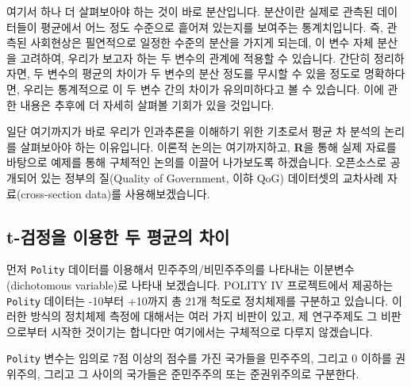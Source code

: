 \documentclass[]{book}
\newenvironment{Shaded}{\begin{snugshade}}{\end{snugshade}}
\newcommand{\CommentTok}[1]{\textcolor[rgb]{0.56,0.35,0.01}{\textit{#1}}}
\newcommand{\DataTypeTok}[1]{\textcolor[rgb]{0.13,0.29,0.53}{#1}}
\newcommand{\DecValTok}[1]{\textcolor[rgb]{0.00,0.00,0.81}{#1}}
\newcommand{\KeywordTok}[1]{\textcolor[rgb]{0.13,0.29,0.53}{\textbf{#1}}}
\newcommand{\NormalTok}[1]{#1}
\newcommand{\OperatorTok}[1]{\textcolor[rgb]{0.81,0.36,0.00}{\textbf{#1}}}
\newcommand{\StringTok}[1]{\textcolor[rgb]{0.31,0.60,0.02}{#1}}
\begin{document}
여기서 하나 더 살펴보아야 하는 것이 바로 분산입니다. 분산이란 실제로 관측된 데이터들이 평균에서 어느 정도 수준으로 흩어져 있는지를 보여주는 통계치입니다. 즉, 관측된 사회현상은 필연적으로 일정한 수준의 분산을 가지게 되는데, 이 변수 자체 분산을 고려하여, 우리가 보고자 하는 두 변수의 관계에 적용할 수 있습니다. 간단히 정리하자면, 두 변수의 평균의 차이가 두 변수의 분산 정도를 무시할 수 있을 정도로 명확하다면, 우리는 통계적으로 이 두 변수 간의 차이가 유의미하다고 볼 수 있습니다. 이에 관한 내용은 추후에 더 자세히 살펴볼 기회가 있을 것입니다.

일단 여기까지가 바로 우리가 인과추론을 이해하기 위한 기초로서 평균 차 분석의 논리를 살펴보아야 하는 이유입니다. 이론적 논의는 여기까지하고, \textbf{R}을 통해 실제 자료를 바탕으로 예제를 통해 구체적인 논의를 이끌어 나가보도록 하겠습니다. 오픈소스로 공개되어 있는 정부의 질(Quality of Government, 이햐 QoG) 데이터셋의 교차사례 자료(cross-section data)를 사용해보겠습니다.

\begin{Shaded}
\end{Shaded}

\hypertarget{t-uxac80uxc815uxc744-uxc774uxc6a9uxd55c-uxb450-uxd3c9uxade0uxc758-uxcc28uxc774}{%
\subsection{t-검정을 이용한 두 평균의 차이}\label{t-uxac80uxc815uxc744-uxc774uxc6a9uxd55c-uxb450-uxd3c9uxade0uxc758-uxcc28uxc774}}

먼저 \texttt{Polity} 데이터를 이용해서 민주주의/비민주주의를 나타내는 이분변수(dichotomous variable)로 나타내 보겠습니다. POLITY IV 프로젝트에서 제공하는 \texttt{Polity} 데이터는 -10부터 +10까지 총 21개 척도로 정치체제를 구분하고 있습니다. 이러한 방식의 정치체제 측정에 대해서는 여러 가지 비판이 있고, 제 연구주제도 그 비판으로부터 시작한 것이기는 합니다만 여기에서는 구체적으로 다루지 않겠습니다.

\texttt{Polity} 변수는 임의로 7점 이상의 점수를 가진 국가들을 민주주의, 그리고 0 이하를 권위주의, 그리고 그 사이의 국가들은 준민주주의 또는 준권위주의로 구분한다.
\end{document}
